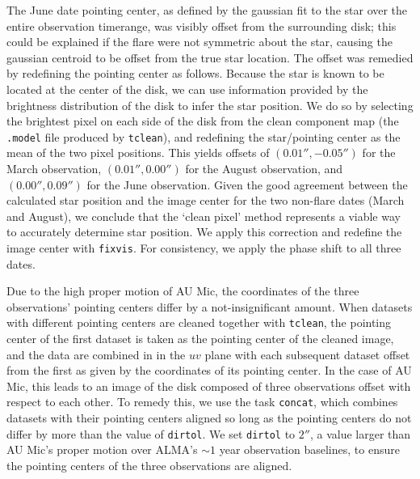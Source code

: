 \documentclass[11pt,modern]{aastex6}
\begin{document}
The June date pointing center, as defined by the gaussian fit to the star over
the entire observation timerange, was visibly offset from the surrounding disk;
this could be explained if the flare were not symmetric about the star, causing
the gaussian centroid to be offset from the true star location. The offset was
remedied by redefining the pointing center as follows. Because the star is known
to be located at the center of the disk, we can use information provided by the
brightness distribution of the disk to infer the star position. We do so by
selecting the brightest pixel on each side of the disk from the clean component
map (the \texttt{.model} file produced by \texttt{tclean}), and redefining the
star/pointing center as the mean of the two pixel positions. This yields offsets
of $(0.01'', -0.05'')$ for the March observation, $(0.01'', 0.00'')$ for the
August observation, and $(0.00'', 0.09'')$ for the June observation. Given the
good agreement between the calculated star position and the image center for the
two non-flare dates (March and August), we conclude that the `clean pixel' method
represents a viable way to accurately determine star position. We apply this
correction and redefine the image center with \texttt{fixvis}. For consistency,
we apply the phase shift to all three dates.

Due to the high proper motion of AU Mic, the coordinates of the three
observations' pointing centers differ by a not-insignificant amount. When
datasets with different pointing centers are cleaned together with
\texttt{tclean}, the pointing center of the first dataset is taken as the
pointing center of the cleaned image, and the data are combined in in the $uv$
plane with each subsequent dataset offset from the first as given by the coordinates
of its pointing center. In the case of AU Mic, this leads to an  image of the
disk composed of three observations offset with respect to each other. To remedy
this, we use the task \texttt{concat}, which combines datasets with their
pointing centers aligned so long as the pointing centers do not differ by more
than the value of \texttt{dirtol}. We set \texttt{dirtol} to $ 2''$, a value
larger than  AU Mic's proper motion over ALMA's $\sim 1$ year observation
baselines, to ensure the pointing centers of the three observations are aligned.
\end{document}
